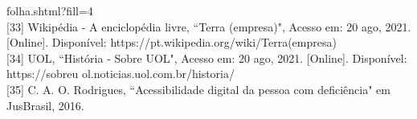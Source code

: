 \documentclass[a4paper]{article}
\begin{document}
\begin{titlepage}
folha.shtml?fill=4\\[0.5cm] [33] Wikipédia - A enciclopédia livre, ``Terra (empresa)", Acesso em: 20 ago, 2021. [Online]. Disponível: https://pt.wikipedia.org/wiki/Terra\textunderscore (empresa)\\[0.5cm] [34] UOL, ``História - Sobre UOL", Acesso em: 20 ago, 2021. [Online]. Disponível: https://sobreu ol.noticias.uol.com.br/historia/\\[0.5cm] [35] C. A. O. Rodrigues, ``Acessibilidade digital da pessoa com deficiência" em JusBrasil, 2016.\\
\end{titlepage}
\end{document}
